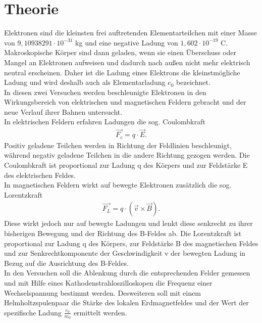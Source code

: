 
 

\section{Theorie}
Elektronen sind die kleinsten frei auftretenden Elementarteilchen mit einer Masse von  $9,10938291\cdot10^{-31}$ kg und eine negative Ladung von $1,602\cdot10^{-19}$ C. Makroskopische Körper sind dann geladen, wenn sie einen Überschuss oder Mangel an Elektronen aufweisen und dadurch nach außen nicht mehr elektrisch neutral erscheinen. Daher ist die Ladung eines Elektrons die kleinstmögliche Ladung und wird deshalb auch als Elementarladung $e_0$ bezeichnet.\\
In diesen zwei Versuchen werden beschleunigte Elektronen in den Wirkungsbereich von elektrischen und magnetischen Feldern gebracht und der neue Verlauf ihrer Bahnen untersucht.\\
In elektrischen Feldern erfahren Ladungen die sog. Coulombkraft 
\begin{align}
\vec{F_c}=q\cdot\vec{E}.
\end{align}
Positiv geladene Teilchen werden in Richtung der Feldlinien beschleunigt, während negativ geladene Teilchen in die andere Richtung gezogen werden. Die Coulombkraft ist proportional zur Ladung q des Körpers und zur Feldstärke E des elektrischen Feldes.\\
In magnetischen Feldern wirkt auf bewegte Elektronen zusätzlich die sog. Lorentzkraft
\begin{align}
\vec{F_L}=q\cdot(\vec{v}\times\vec{B}).
\end{align}
Diese wirkt jedoch nur auf bewegte Ladungen und lenkt diese senkrecht zu ihrer bisherigen Bewegung und der Richtung des B-Feldes ab. Die Lorentzkraft ist proportional zur Ladung q des Körpers, zur Feldstärke B des magnetischen Feldes und zur Senkrechtkomponente der Geschwindigkeit v der bewegten Ladung in Bezug auf die Ausrichtung des B-Feldes.\\
In den Versuchen soll die Ablenkung durch die entsprechenden Felder gemessen und mit Hilfe eines Kathodenstrahloszilloskopen die Frequenz einer Wechselspannung bestimmt werden. Desweiteren soll mit einem Helmholtzspulenpaar die Stärke des lokalen Erdmagnetfeldes und der Wert der spezifische Ladung $\frac{e_0}{m_0}$ ermittelt werden.

